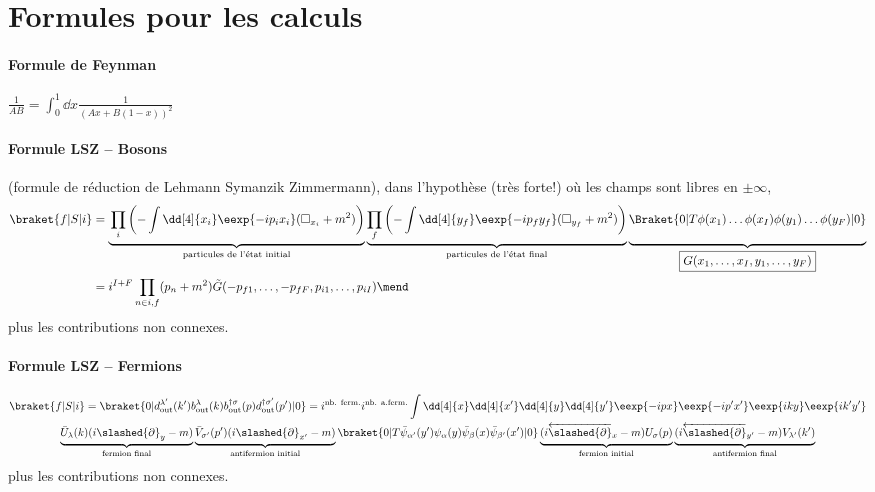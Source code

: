 \documentclass{article}
\title{}
\author[L. \textsc{Torterotot}]{Lucas \textsc{Torterotot}}
\date{}
\subtitle{}
\begin{document}
\maketitle


\section{Formules pour les calculs}

\paragraph{Formule de Feynman} $\displaystyle \frac{1}{AB} = \int_0^1 \dd{x} \frac{1}{(Ax + B(1-x))^2}$

\paragraph{Formule LSZ -- Bosons} (formule de réduction de Lehmann Symanzik Zimmermann), dans l'hypothèse (très forte!) où les champs sont libres en $\pm\infty$,
\begin{align*}
\braket{f|S|i} &=
\underbrace{\vphantom{\prod_f}\prod_i \left( -\int\dd[4]{x_i}\eexp{-ip_ix_i}(\square_{x_i}+m^2) \right)}_\text{particules de l'état initial}
\underbrace{\prod_f \left( -\int\dd[4]{y_f}\eexp{-ip_fy_f}(\square_{y_f}+m^2) \right)}_\text{particules de l'état final}
\underbrace{\vphantom{\prod_f}\Braket{0|T\phi(x_1)\dots\phi(x_I)\phi(y_1)\dots\phi(y_F)|0}}_{\boxed{G(x_1,\dots,x_I,y_1,\dots,y_F)}}
\\
&=
i^{I+F} \prod_{n\in i,f} (p_n + m^2) \tilde{G}(-p_{f1},\dots,-p_{fF},p_{i1},\dots,p_{iI})
\mend
\end{align*}
plus les contributions non connexes.

\paragraph{Formule LSZ -- Fermions} 
\begin{multline*}
\braket{f|S|i} = \braket{0|
d_\text{out}^{\lambda'}(k')b_\text{out}^{\lambda}(k)
b_\text{out}^{\dagger\sigma}(p)d_\text{out}^{\dagger\sigma'}(p')|0}
=
i^\text{nb. ferm.}
i^\text{nb. a.ferm.}
\int \dd[4]{x}\dd[4]{x'}\dd[4]{y}\dd[4]{y'}
\eexp{-ipx}\eexp{-ip'x'}\eexp{iky}\eexp{ik'y'}
\\
\underbrace{\vphantom{\slashed{\partial}_{y'}}\bar{U}_\lambda(k)(i\slashed{\partial}_y-m)}_\text{fermion final}
\underbrace{\vphantom{\slashed{\partial}_{y'}}\bar{V}_{\sigma'}(p')(i\slashed{\partial}_{x'}-m)}_\text{antifermion initial}
\braket{0|T\bar{\psi}_{\alpha'}(y'){\psi}_{\alpha}(y)\bar{\psi}_{\beta}(x)\bar{\psi}_{\beta'}(x')|0}
\underbrace{\vphantom{\slashed{\partial}_{y'}}(i\overleftarrow{\slashed{\partial}}_x-m){U}_\sigma(p)}_\text{fermion initial}
\underbrace{\vphantom{\slashed{\partial}_{y'}}(i\overleftarrow{\slashed{\partial}}_{y'}-m){V}_{\lambda'}(k')}_\text{antifermion final}
\end{multline*}
plus les contributions non connexes.
\end{document}
